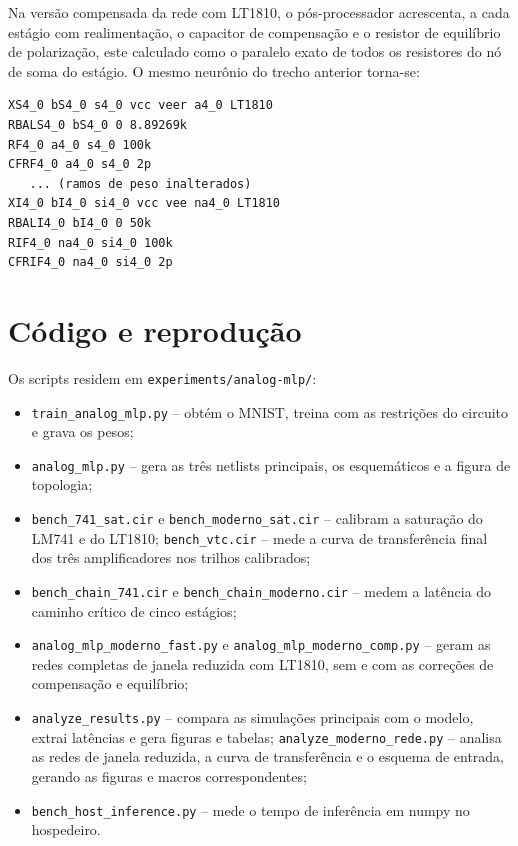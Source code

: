 Na versão compensada da rede com LT1810, o pós-processador
acrescenta, a cada estágio com realimentação, o capacitor de
compensação e o resistor de equilíbrio de polarização, este calculado
como o paralelo exato de todos os resistores do nó de soma do
estágio. O mesmo neurônio do trecho anterior torna-se:

{\small
\begin{verbatim}
XS4_0 bS4_0 s4_0 vcc veer a4_0 LT1810
RBALS4_0 bS4_0 0 8.89269k
RF4_0 a4_0 s4_0 100k
CFRF4_0 a4_0 s4_0 2p
   ... (ramos de peso inalterados)
XI4_0 bI4_0 si4_0 vcc vee na4_0 LT1810
RBALI4_0 bI4_0 0 50k
RIF4_0 na4_0 si4_0 100k
CFRIF4_0 na4_0 si4_0 2p
\end{verbatim}
}

\section{Código e reprodução}
\label{ap:codigo}

Os scripts residem em \texttt{experiments/analog-mlp/}:

\begin{itemize}
  \item \texttt{train\_analog\_mlp.py} -- obtém o MNIST, treina com as
        restrições do circuito e grava os pesos;
  \item \texttt{analog\_mlp.py} -- gera as três netlists principais,
        os esquemáticos e a figura de topologia;
  \item \texttt{bench\_741\_sat.cir} e
        \texttt{bench\_moderno\_sat.cir} -- calibram a saturação do
        LM741 e do LT1810; \texttt{bench\_vtc.cir} -- mede a curva de
        transferência final dos três amplificadores nos trilhos
        calibrados;
  \item \texttt{bench\_chain\_741.cir} e
        \texttt{bench\_chain\_moderno.cir} -- medem a latência do
        caminho crítico de cinco estágios;
  \item \texttt{analog\_mlp\_moderno\_fast.py} e
        \texttt{analog\_mlp\_moderno\_comp.py} -- geram as redes
        completas de janela reduzida com LT1810, sem e com as
        correções de compensação e equilíbrio;
  \item \texttt{analyze\_results.py} -- compara as simulações
        principais com o modelo, extrai latências e gera figuras e
        tabelas; \texttt{analyze\_moderno\_rede.py} -- analisa as
        redes de janela reduzida, a curva de transferência e o esquema
        de entrada, gerando as figuras e macros correspondentes;
  \item \texttt{bench\_host\_inference.py} -- mede o tempo de
        inferência em numpy no hospedeiro.
\end{itemize}

